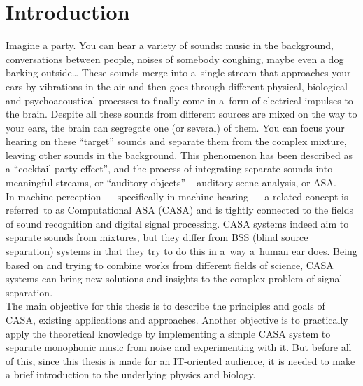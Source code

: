 \chapter{Introduction}

Imagine a party. You can hear a variety of sounds: music in the background, conversations between people, noises of somebody coughing, maybe even a dog barking outside\dots{} These sounds merge into a~single stream that approaches your ears by vibrations in the air and then goes through different physical, biological and psychoacoustical processes to finally come in a~form of electrical impulses to the brain. Despite all these sounds from different sources are mixed on the way to your ears, the brain can segregate one (or several) of them. You can focus your hearing on these “target” sounds and separate them from the complex mixture, leaving other sounds in the background. This phenomenon has been described as a “cocktail party effect”, and the process of integrating separate sounds into meaningful streams, or “auditory objects” -- auditory scene analysis, or ASA.\\

In machine perception --- specifically in machine hearing --- a related concept is referred~to as Computational ASA (CASA) and is tightly connected to the fields of sound recognition and digital signal processing. CASA systems indeed aim to separate sounds from mixtures, but they differ from BSS (blind source separation) systems in that they try to do this in a~way a~human ear does. Being based on and trying to combine works from different fields of science, CASA systems can bring new solutions and insights to the complex problem of signal separation.\\

The main objective for this thesis is to describe the principles and goals of CASA, existing applications and approaches. Another objective is to practically apply the theoretical knowledge by implementing a simple CASA system to separate monophonic music from noise and experimenting with it. But before all of this, since this thesis is made for an IT-oriented audience, it is needed to make a brief introduction to the underlying physics and biology.\\

